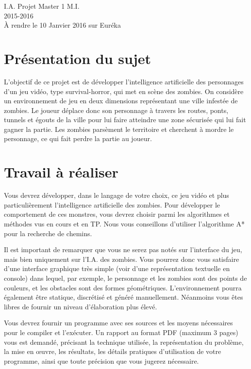 \documentclass[a4paper,11pt]{article}
\begin{document}
\begin{center}
\Large{I.A. Projet Master 1 M.I.\\2015-2016\\}
À rendre le 10 Janvier 2016 sur Euréka
\end{center}

\section{Présentation du sujet}

L'objectif de ce projet est de développer l'intelligence artificielle des personnages d'un jeu vidéo, type survival-horror, qui met en scène des zombies. On considère un environnement de jeu en deux dimensions représentant une ville infestée de zombies. Le joueur déplace donc son personnage à travers les routes, ponts, tunnels et égouts de la ville pour lui faire atteindre une zone sécurisée qui lui fait gagner la partie. Les zombies parsèment le territoire et cherchent à mordre le personnage, ce qui fait perdre la partie au joueur.

\section{Travail à réaliser}

Vous devrez développer, dans le langage de votre choix, ce jeu vidéo et plus particulièrement l'intelligence artificielle des zombies. Pour développer le comportement de ces monstres, vous devrez choisir parmi les algorithmes et méthodes vus en cours et en TP. Nous vous conseillons d'utiliser l'algorithme A* pour la recherche de chemins.

Il est important de remarquer que vous ne serez pas notés sur l'interface du jeu, mais bien uniquement sur l'I.A. des zombies. Vous pourrez donc vous satisfaire d'une interface graphique très simple (voir d'une représentation textuelle en console) dans lequel, par exemple, le personnage et les zombies sont des points de couleurs, et les obstacles sont des formes géométriques. L'environnement pourra également être statique, discrétisé et généré manuellement. Néanmoins vous êtes libres de fournir un niveau d'élaboration plus élevé.

Vous devrez fournir un programme avec ses sources et les moyens nécessaires pour le compiler et l'exécuter. Un rapport au format PDF (maximum 3 pages) vous est demandé, précisant la technique utilisée, la représentation du problème, la mise en \oe uvre, les résultats, les détails pratiques d'utilisation de votre programme, ainsi que toute précision que vous jugerez nécessaire.
\end{document}
